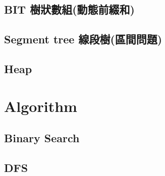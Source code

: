 \subsection{BIT 樹狀數組(動態前綴和)}


\subsection{Segment tree 線段樹(區間問題)}


\subsection{Heap}


%

%

%





\section{Algorithm}

\subsection{Binary Search}


%

\subsection{DFS}


